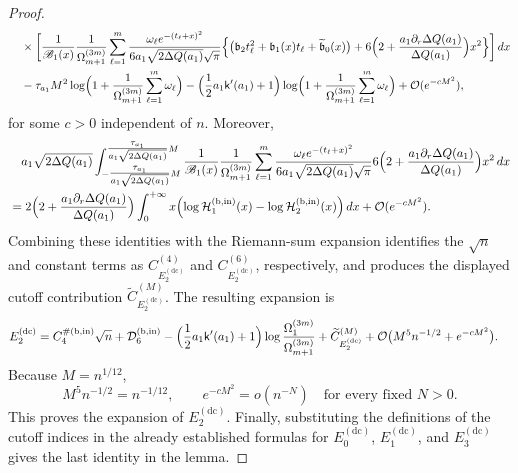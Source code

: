 \documentclass[a4paper]{article}
\numberwithin{equation}{section}
\begin{document}
\begin{proof}
\begin{align*}
&\quad
\times
\bigg[
\frac{1}{\mathscr{B}_1(x)}
\frac{1}{\Omega_{m+1}^{(3m)}}
\sum_{\ell=1}^{m}
\frac{\omega_{\ell}e^{-(t_{\ell}+x)^2}}{6a_1\sqrt{2\Delta Q(a_1)}\sqrt{\pi}}
\Bigl\{
\bigl( 
\mathfrak{b}_2t_{\ell}^2+\mathfrak{b}_1(x)t_{\ell}+\widetilde{\mathfrak{b}}_0(x)
\bigr)
+6\Bigl(
2+\frac{a_1\partial_r\Delta Q(a_1)}{\Delta Q(a_1)}
\Bigr)x^2
\Bigr\}
\bigg]
\,dx
\\
&\quad
-
\tau_{a_1}M^2
\log\Bigl( 
1+\frac{1}{\Omega_{m+1}^{(3m)}}\sum_{\ell=1}^{m}\omega_{\ell}
\Bigr)
-
\Bigl( 
\frac{1}{2}a_1\mathsf{k}'(a_1)+1
\Bigr)
\log\Bigl( 
1+\frac{1}{\Omega_{m+1}^{(3m)}}\sum_{\ell=1}^{m}\omega_{\ell}
\Bigr)
+\mathcal{O}(e^{-cM^2}),
\end{align*}
for some $c>0$ independent of $n$.  Moreover,
\begin{align*}
&\quad a_1\sqrt{2\Delta Q(a_1)}
\int_{-\tfrac{\tau_{a_1}}{a_1\sqrt{2\Delta Q(a_1)}}M}^{\tfrac{\tau_{a_1}}{a_1\sqrt{2\Delta Q(a_1)}}M}
\frac{1}{\mathscr{B}_1(x)}
\frac{1}{\Omega_{m+1}^{(3m)}}
\sum_{\ell=1}^{m}
\frac{\omega_{\ell}e^{-(t_{\ell}+x)^2}}{6a_1\sqrt{2\Delta Q(a_1)}\sqrt{\pi}}
6\Bigl(
2+\frac{a_1\partial_r\Delta Q(a_1)}{\Delta Q(a_1)}
\Bigr)x^2\,dx
\\
&=
2\Bigl(
2+\frac{a_1\partial_r\Delta Q(a_1)}{\Delta Q(a_1)}
\Bigr)
\int_{0}^{+\infty}
x\Bigl( 
\log\mathcal{H}_1^{(\mathrm{b},\mathrm{in})}(x) - \log\mathcal{H}_2^{(\mathrm{b},\mathrm{in})}(x)
\Bigr)\,dx
+
\mathcal{O}(e^{-cM^2}). 
\end{align*}
Combining these identities with the Riemann-sum expansion identifies the
$\sqrt n$ and constant terms as
$C_{E_2^{(\mathrm{dc})}}^{(4)}$ and
$C_{E_2^{(\mathrm{dc})}}^{(6)}$, respectively, and produces the displayed
cutoff contribution $\widetilde C_{E_2^{(\mathrm{dc})}}^{(M)}$.  The resulting expansion is
\begin{align*}
E_2^{(\mathrm{dc})}
&=C_4^{\#(\mathrm{b,in})}\sqrt n
+\mathcal D_6^{(\mathrm{b},\mathrm{in})}
-\Bigl(\frac12a_1\mathsf k'(a_1)+1\Bigr)
 \log\frac{\Omega_1^{(3m)}}{\Omega_{m+1}^{(3m)}}
+\widetilde C_{E_2^{(\mathrm{dc})}}^{(M)}
+\mathcal O\bigl(M^5n^{-1/2}+e^{-cM^2}\bigr).
\end{align*}
Because
$M=n^{1/12}$,
\[
M^5n^{-1/2}=n^{-1/12},
\qquad e^{-cM^2}=o(n^{-N})\quad\text{for every fixed }N>0.
\]
This proves the expansion of $E_2^{(\mathrm{dc})}$.  Finally, substituting
the definitions of the cutoff indices in the already established formulas
for $E_0^{(\mathrm{dc})}$, $E_1^{(\mathrm{dc})}$, and
$E_3^{(\mathrm{dc})}$ gives the last identity in the lemma.
\end{proof}
\end{document}
